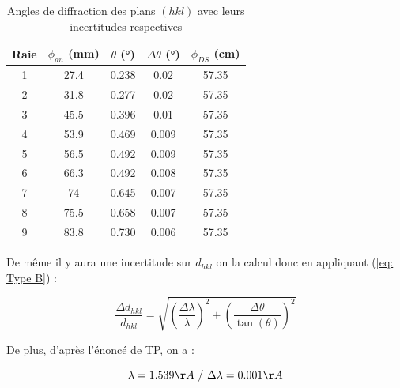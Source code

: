 \begin{table}[h!]
	\centering
	\begin{tabular}{|c|c|c|c|c|}
		
		\hline
Raie	&	$\phi_{an}$ (mm) & $\theta $ (°)	 & $\Delta \theta$ (°) & $\phi_{DS}$ (cm) \\ \hline
1 &	27.4	&           0.238          &    0.02    & 57.35\\ \hline
2 &	31.8	&        0.277              &   0.02     & 57.35\\ \hline
3 &	45.5	&          0.396           &    0.01   & 57.35 \\ \hline
4 &	53.9	&          0.469            &  0.009      & 57.35\\ \hline
 5 &	56.5	&      0.492                 &   0.009   &57.35  \\ \hline
6&	66.3	&            0.492          &     0.008	  & 57.35\\ \hline
7&	74	&               0.645        &     0.007   & 57.35\\ \hline
8&	75.5	&           0.658           &   0.007    & 57.35 \\ \hline
9&	83.8	&            0.730          &   0.006    & 57.35 \\ \hline
	\end{tabular}
	\caption{Angles de diffraction des plans $(h k l)$ avec leurs incertitudes respectives
	 }
	\label{tab:Tableau des angles correspondant aux diffrentes raies en fonction de phi DS}
\end{table}

De même il y aura une incertitude sur $d_{hkl}$ on la calcul donc en appliquant (\ref{eq: Type B}) :

\begin{equation} \label{eq: Type B dhkl}
	\frac{\Delta d_{hkl}}{d_{hkl}} = \sqrt{\left ( \frac{\Delta \lambda }{\lambda} \right )^2 + \left ( \frac{\Delta \theta}{\tan(\theta)} \right )^2 }
\end{equation}

De plus, d'après l'énoncé de TP, on a		  :

\begin{equation}
	\lambda = 1.539 \AA \ / \ \Delta \lambda = 0.001 \AA
\end{equation}

